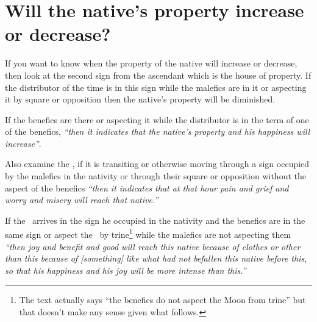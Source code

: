 \section{Will the native's property increase or decrease?}
If you want to know when the property of the native will increase or decrease, then look at the second sign from the ascendant which is the house of property. If the distributor of the time is in this sign while the malefics are in it or aspecting it by square or opposition then the native's property will be diminished.

If the benefics are there or aspecting it while the distributor is in the term of one of the benefics, \textsl{``then it indicates that the native's property and his happiness will increase''}.

Also examine the \Moon, if it is transiting or otherwise moving through a sign occupied by the malefics in the nativity or through their square or opposition without the aspect of the benefics \textsl{``then it indicates that at that hour pain and grief and worry and misery will reach that native.''}

If the \Moon\, arrives in the sign he occupied in the nativity and the benefics are in the same sign or aspect the \Moon\, by trine\footnote{The text actually says ``the benefics do not aspect the Moon from trine'' but that doesn't make any sense given what follows.} while the malefics are not aspecting them \textsl{``then joy and benefit and good will reach this native because of clothes or other than this because of [something] like what had not befallen this native before this, so that his happiness and his joy will be more intense than this.''}


